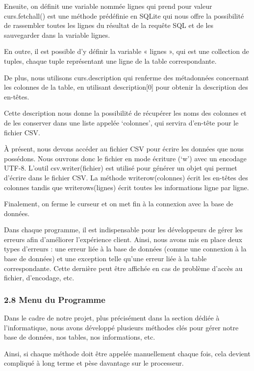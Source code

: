 \documentclass[
]{article}
\begin{document}
Ensuite, on définit une variable nommée lignes qui prend pour valeur
curs.fetchall() est une méthode prédéfinie en SQLite qui nous offre la
possibilité de rassembler toutes les lignes du résultat de la requête
SQL et de les sauvegarder dans la variable lignes.

En outre, il est possible d'y définir la variable « lignes », qui est
une collection de tuples, chaque tuple représentant une ligne de la
table correspondante.

De plus, nous utilisons curs.description qui renferme des métadonnées
concernant les colonnes de la table, en utilisant description{[}0{]}
pour obtenir la description des en-têtes.

Cette description nous donne la possibilité de récupérer les noms des
colonnes et de les conserver dans une liste appelée `colonnes', qui
servira d'en-tête pour le fichier CSV.

À présent, nous devons accéder au fichier CSV pour écrire les données
que nous possédons. Nous ouvrons donc le fichier en mode écriture (`w')
avec un encodage UTF-8. L'outil csv.writer(fichier) est utilisé pour
générer un objet qui permet d'écrire dans le fichier CSV. La méthode
writerow(colonnes) écrit les en-têtes des colonnes tandis que
writerows(lignes) écrit toutes les informations ligne par ligne.

Finalement, on ferme le curseur et on met fin à la connexion avec la
base de données.

Dans chaque programme, il est indispensable pour les développeurs de
gérer les erreurs afin d'améliorer l'expérience client. Ainsi, nous
avons mis en place deux types d'erreurs : une erreur liée à la base de
données (comme une connexion à la base de données) et une exception
telle qu'une erreur liée à la table correspondante. Cette dernière peut
être affichée en cas de problème d'accès au fichier, d'encodage, etc.

\subsubsection{2.8 Menu du Programme}\label{menu-du-programme}

Dans le cadre de notre projet, plus précisément dans la section dédiée à
l'informatique, nous avons développé plusieurs méthodes clés pour gérer
notre base de données, nos tables, nos informations, etc.

Ainsi, si chaque méthode doit être appelée manuellement chaque fois,
cela devient compliqué à long terme et pèse davantage sur le processeur.
\end{document}
